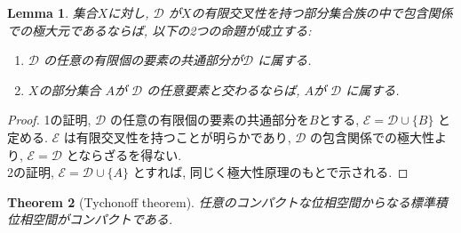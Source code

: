 \documentclass[lualatex]{ltjsbook}
\newtheorem{theorem}{Theorem}[section]
\newtheorem{lemma}[theorem]{Lemma}
\theoremstyle{remark}
\theoremstyle{plain}
\begin{document}
\begin{lemma}
	集合$X$に対し,  $\mathcal{D}$ が$X$の有限交叉性を持つ部分集合族の中で包含関係での極大元であるならば, 以下の2つの命題が成立する: 
	 \begin{enumerate}
		\item $\mathcal{D}$ の任意の有限個の要素の共通部分が$\mathcal{D}$ に属する.
		\item $X$の部分集合 $A$が $\mathcal{D}$ の任意要素と交わるならば, $A$が $\mathcal{D}$ に属する.
	\end{enumerate}
\end{lemma}

\begin{proof}
	1の証明, $\mathcal{D}$ の任意の有限個の要素の共通部分を$B$とする,  $\mathcal{E} = \mathcal{D}\cup \{B\} $ と定める. $\mathcal{E}$ は有限交叉性を持つことが明らかであり, $\mathcal{D}$ の包含関係での極大性より, $\mathcal{E}=\mathcal{D}$ とならざるを得ない.\\
	2の証明, $\mathcal{E} = \mathcal{D} \cup \{A\} $ とすれば, 同じく極大性原理のもとで示される.
\end{proof}

\begin{theorem}[Tychonoff theorem]
	任意のコンパクトな位相空間からなる標準積位相空間がコンパクトである.
\end{theorem}
\end{document}
